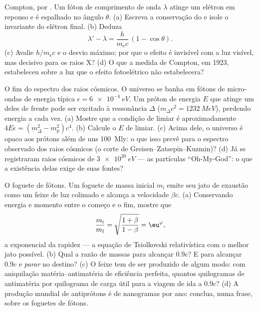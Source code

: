 \begin{exercise}[$\star\star\star$]\label{exo:b3:relativistic-dynamics:10}
Compton, por . Um fóton de comprimento de onda $\lambda$
atinge um elétron em repouso e é espalhado no ângulo $\theta$. (a)
Escreva a conservação do  e isole o invariante do elétron
final. (b) Deduza
\[
\lambda' - \lambda = \frac{h}{m_{\text{e}}c}\,(1 - \cos\theta) .
\]
(c) Avalie $h/m_{\text{e}}c$ e o desvio máximo; por que o efeito é
invisível com a luz visível, mas decisivo para os raios X? (d) O que a
medida de Compton, em 1923, estabeleceu sobre a luz que o efeito
fotoelétrico não estabelecera?
\end{exercise}

\begin{exercise}[$\star\star\star$]\label{exo:b3:relativistic-dynamics:11}
O fim do espectro dos raios cósmicos. O universo se banha em fótons de
micro-ondas de energia típica $\epsilon = \qty{6e-4}{eV}$. Um próton de
energia $E$ que atinge um deles de frente pode ser excitado à
ressonância $\Delta$ ($m_\Delta c^2 = \qty{1232}{MeV}$), perdendo
energia a cada vez. (a) Mostre que a condição de limiar é
aproximadamente $4E\epsilon =
(m_\Delta^2 - m_{\text{p}}^2)c^4$. (b) Calcule o $E$ de limiar.
(c) Acima dele, o universo é opaco aos prótons além de uns
\qty{100}{Mly}: o que isso prevê para o espectro observado dos raios
cósmicos (o corte de Greisen--Zatsepin--Kuzmin)? (d) Já se registraram
raios cósmicos de $\qty{3e20}{eV}$ --- as partículas ``Oh-My-God'': o
que a existência delas exige de suas fontes?
\end{exercise}

\begin{exercise}[$\star\star\star$]\label{exo:b3:relativistic-dynamics:12}
O foguete de fótons. Um foguete de massa inicial $m_{\text{i}}$ emite
seu jato de exaustão como um feixe de luz colimado e alcança a
velocidade $\beta c$. (a) Conservando energia e momento entre o começo
e o fim, mostre que
\[
\frac{m_{\text{i}}}{m_{\text{f}}} =
\sqrt{\frac{1 + \beta}{1 - \beta}} = \eu^{\varphi} ,
\]
a exponencial da rapidez --- a equação de Tsiolkovski relativística com
o melhor jato possível. (b) Qual a razão de massas para alcançar
$0.9c$? E para alcançar $0.9c$ e \emph{parar} no destino? (c) O feixe
tem de ser produzido de algum modo: com aniquilação
matéria--antimatéria de eficiência perfeita, quantos quilogramas de
antimatéria por quilograma de carga útil para a viagem de ida a $0.9c$?
(d) A produção mundial de antiprótons é de nanogramas por ano: conclua,
numa frase, sobre os foguetes de fótons.
\end{exercise}

